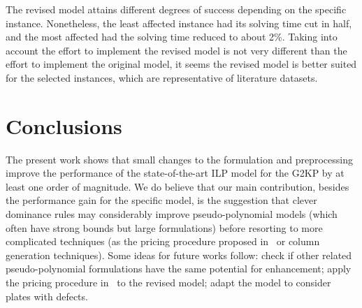 \documentclass[smallextended]{svjour3}       %
\begin{document}
The revised model attains different degrees of success depending on the specific instance.
Nonetheless, the least affected instance had its solving time cut in half, and the most affected had the solving time reduced to about 2\%.
Taking into account the effort to implement the revised model is not very different than the effort to implement the original model, it seems the revised model is better suited for the selected instances, which are representative of literature datasets.


\section{Conclusions}

The present work shows that small changes to the formulation and preprocessing improve the performance of the state-of-the-art ILP model for the G2KP by at least one order of magnitude.
We do believe that our main contribution, besides the performance gain for the specific model, is the suggestion that clever dominance rules may considerably improve pseudo-polynomial models (which often have strong bounds but large formulations) before resorting to more complicated techniques (as the pricing procedure proposed in~\cite{furini:2016} or column generation techniques).
Some ideas for future works follow: check if other related pseudo-polynomial formulations have the same potential for enhancement; apply the pricing procedure in~\cite{furini:2016} to the revised model; adapt the model to consider plates with defects.

\end{document}
